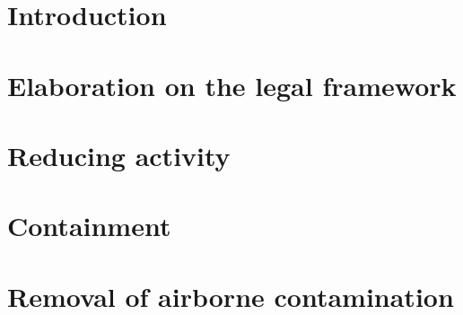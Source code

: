 \section{Introduction}
\section{Elaboration on the legal framework}
\section{Reducing activity}
\section{Containment}
\section{Removal of airborne contamination}
